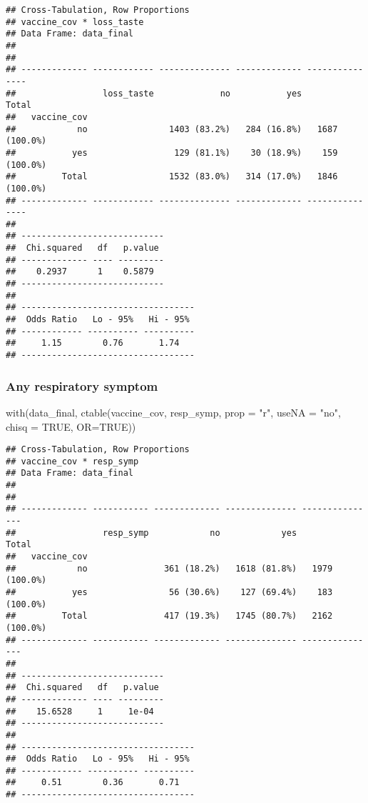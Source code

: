 \documentclass[
]{article}
\newenvironment{Shaded}{\begin{snugshade}}{\end{snugshade}}
\newcommand{\AttributeTok}[1]{\textcolor[rgb]{0.77,0.63,0.00}{#1}}
\newcommand{\ConstantTok}[1]{\textcolor[rgb]{0.00,0.00,0.00}{#1}}
\newcommand{\FunctionTok}[1]{\textcolor[rgb]{0.00,0.00,0.00}{#1}}
\newcommand{\NormalTok}[1]{#1}
\newcommand{\StringTok}[1]{\textcolor[rgb]{0.31,0.60,0.02}{#1}}
\begin{document}
\begin{verbatim}
## Cross-Tabulation, Row Proportions  
## vaccine_cov * loss_taste  
## Data Frame: data_final  
## 
## 
## ------------- ------------ -------------- ------------- ---------------
##                 loss_taste             no           yes           Total
##   vaccine_cov                                                          
##            no                1403 (83.2%)   284 (16.8%)   1687 (100.0%)
##           yes                 129 (81.1%)    30 (18.9%)    159 (100.0%)
##         Total                1532 (83.0%)   314 (17.0%)   1846 (100.0%)
## ------------- ------------ -------------- ------------- ---------------
## 
## ----------------------------
##  Chi.squared   df   p.value 
## ------------- ---- ---------
##    0.2937      1    0.5879  
## ----------------------------
## 
## ----------------------------------
##  Odds Ratio   Lo - 95%   Hi - 95% 
## ------------ ---------- ----------
##     1.15        0.76       1.74   
## ----------------------------------
\end{verbatim}

\hypertarget{any-respiratory-symptom}{%
\subsubsection{Any respiratory symptom}\label{any-respiratory-symptom}}

\begin{Shaded}
\begin{Highlighting}[]
\FunctionTok{with}\NormalTok{(data\_final, }\FunctionTok{ctable}\NormalTok{(vaccine\_cov, resp\_symp, }\AttributeTok{prop =} \StringTok{"r"}\NormalTok{, }\AttributeTok{useNA =} \StringTok{"no"}\NormalTok{, }\AttributeTok{chisq =} \ConstantTok{TRUE}\NormalTok{, }\AttributeTok{OR=}\ConstantTok{TRUE}\NormalTok{))}
\end{Highlighting}
\end{Shaded}

\begin{verbatim}
## Cross-Tabulation, Row Proportions  
## vaccine_cov * resp_symp  
## Data Frame: data_final  
## 
## 
## ------------- ----------- ------------- -------------- ---------------
##                 resp_symp            no            yes           Total
##   vaccine_cov                                                         
##            no               361 (18.2%)   1618 (81.8%)   1979 (100.0%)
##           yes                56 (30.6%)    127 (69.4%)    183 (100.0%)
##         Total               417 (19.3%)   1745 (80.7%)   2162 (100.0%)
## ------------- ----------- ------------- -------------- ---------------
## 
## ----------------------------
##  Chi.squared   df   p.value 
## ------------- ---- ---------
##    15.6528     1     1e-04  
## ----------------------------
## 
## ----------------------------------
##  Odds Ratio   Lo - 95%   Hi - 95% 
## ------------ ---------- ----------
##     0.51        0.36       0.71   
## ----------------------------------
\end{verbatim}
\end{document}
